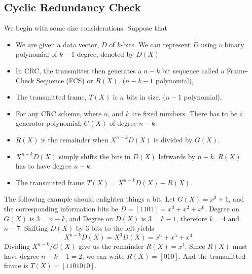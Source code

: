 \documentclass[../../main.tex]{subfiles}
\begin{document}
\subsection{Cyclic Redundancy Check}
We begin with some size considerations. Suppose that
\begin{itemize}
    \item We are given a data vector, $D$ of $k$-bits. We can represent $D$ using a binary polynomial of $k-1$ degree, denoted by $D(X)$
    \item In CRC, the transmitter then generates a $n-k$ bit sequence called a Frame-Check Sequence (FCS) or $R(X)$. ($n-k-1$ polynomial),
    \item The transmitted frame, $T(X)$ is $n$ bits in size. ($n-1$ polynomial).
    \item For any CRC scheme, where $n$, and $k$ are fixed numbers. There has to be a generator polynomial, $G(X)$ of degree $n-k$.
    \item $R(X)$ is the remainder when $X^{n-k}D(X)$ is divided by $G(X)$.
    \item $X^{n-k}D(X)$ simply shifts the bits in $D(X)$ leftwards by $n-k$. $R(X)$ has to have degree $n-k$.
    \item The transmitted frame $T(X) = X^{n-k}D(X) + R(X)$.
\end{itemize}
The following example should enlighten things a bit. Let $G(X) = x^3 + 1$, and the corresponding information bits be $D = [1101]=x^3+x^2+x^0$. Degree on $G(X)$ is $3=n-k$, and Degree on $D(X)$ is $3=k-1$, therefore $k=4$ and $n-7$. Shifting $D(X)$ by $3$ bits to the left yields
\[
X^{n-k}D(X) = X^3D(X) = x^6 + x^5 + x^3
\]
Dividing $X^{n-k}/G(X)$ give us the remainder $R(X) = x^1$. Since $R(X)$ must have degree $n-k-1=2$, we can write $R(X) = [010]$. And the transmitted frame is $T(X) = [1101010]$.
\end{document}
